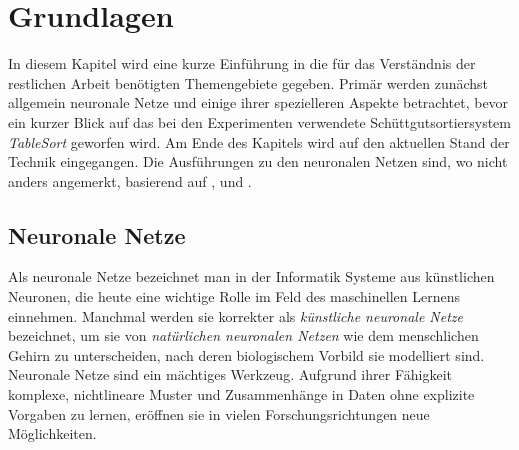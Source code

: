\chapter{Grundlagen}
\label{cap:basics}



In diesem Kapitel wird eine kurze Einführung in die für das Verständnis der restlichen Arbeit benötigten Themengebiete gegeben.
Primär werden zunächst allgemein neuronale Netze und einige ihrer spezielleren Aspekte betrachtet, 
bevor ein kurzer Blick auf das bei den Experimenten verwendete Schüttgutsortiersystem \textit{TableSort} geworfen wird. 
Am Ende des Kapitels wird auf den aktuellen Stand der Technik eingegangen.
Die Ausführungen zu den neuronalen Netzen sind, wo nicht anders angemerkt, basierend auf \cite{Goodfellow-et-al-2016}, \cite{Murphy:2012:MLP:2380985} und \cite{nielsen2015neural}.

% 

\section{Neuronale Netze}

Als neuronale Netze  %
bezeichnet man in der Informatik Systeme aus künstlichen Neuronen, die heute eine wichtige Rolle im Feld des maschinellen Lernens einnehmen.
Manchmal werden sie korrekter als \textit{künstliche neuronale Netze} bezeichnet, um sie von \textit{natürlichen neuronalen Netzen} 
wie dem menschlichen Gehirn zu unterscheiden, nach deren biologischem Vorbild sie modelliert sind.
Neuronale Netze sind ein mächtiges Werkzeug. 
Aufgrund ihrer Fähigkeit komplexe, nichtlineare Muster und Zusammenhänge in Daten ohne explizite Vorgaben zu lernen, 
eröffnen sie in vielen Forschungsrichtungen neue Möglichkeiten.


